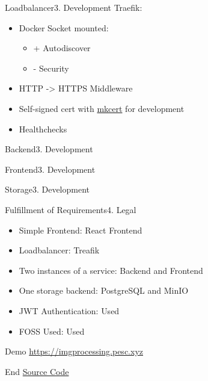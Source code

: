 \documentclass[aspectratio=169,20pt]{beamer}
\begin{document}
\begin{frame}{Loadbalancer}{3. Development}
    Traefik:
	\begin{itemize}
		\item{Docker Socket mounted:}
		\begin{itemize}
			\item{+ Autodiscover}
			\item{- Security}
		\end{itemize}
		\item{HTTP -> HTTPS Middleware}
        \item{Self-signed cert with \href{https://github.com/FiloSottile/mkcert}{mkcert} for development}
        \item{Healthchecks}
	\end{itemize}
\end{frame}

\begin{frame}{Backend}{3. Development}

\end{frame}

\begin{frame}{Frontend}{3. Development}

\end{frame}

\begin{frame}{Storage}{3. Development}

\end{frame}

\begin{frame}{Fulfillment of Requirements}{4. Legal}
    \begin{itemize}
        \item{Simple Frontend: \textcolor{deepgreen}{React Frontend}}
        \item{Loadbalancer: \textcolor{deepgreen}{Treafik}}
        \item{Two instances of a service: \textcolor{deepgreen}{Backend and Frontend}}
        \item{One storage backend: \textcolor{deepgreen}{PostgreSQL and MinIO}}
        \item{JWT Authentication: \textcolor{deepgreen}{Used}}
        \item{FOSS Used: \textcolor{deepgreen}{Used}}
    \end{itemize}
\end{frame}


\begin{frame}{Demo}{}
	\href{https://imgprocessing.pesc.xyz/}{https://imgprocessing.pesc.xyz}
\end{frame}

\begin{frame}{End}{}
	\href{https://github.com/imgProcessing/backend}{Source Code}
\end{frame}
\end{document}
